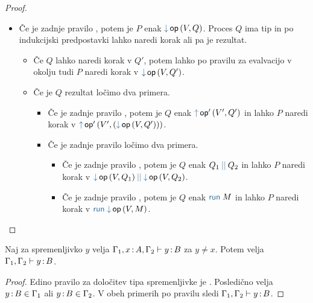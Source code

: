 \begin{proof}
\begin{itemize}
		\item Če je zadnje pravilo , potem je $P$ enak $\tmopin{op}{V}{Q}$. Proces $Q$ ima tip in po indukcijski predpostavki lahko naredi korak ali pa je rezultat.
		\begin{itemize}
			\item Če $Q$ lahko naredi korak v $Q'$, potem lahko po pravilu za evalvacijo v okolju tudi $P$ naredi korak v $\tmopin{op}{V}{Q'}$.
			\item Če je $Q$ rezultat ločimo dva primera.
			\begin{itemize}
				
				\item Če je zadnje pravilo , potem je $Q$ enak $\tmopout{op'}{V'}{Q'}$ in lahko $P$ naredi korak v $\tmopout{op'}{V'}{(\tmopin{op}{V}{Q'})}$.
				
				\item Če je zadnje pravilo  ločimo dva primera.
				\begin{itemize}
					\item Če je zadnje pravilo , potem je $Q$ enak $\tmpar{Q_1}{Q_2}$ in lahko $P$ naredi korak v $\tmpar{\tmopin{op}{V}{Q_1}}{\tmopin{op}{V}{Q_2}}$.
					\item Če je zadnje pravilo , potem je $Q$ enak $\tmrun{M}$ in lahko $P$ naredi korak v $\tmrun{\tmopin{op}{V}{M}}$.
				\end{itemize}
				
			\end{itemize}
		
		\end{itemize}
		
	\end{itemize}
		
\end{proof}


\begin{lema}\label{lem:strengthening-gamma}
	Naj za spremenljivko $y$ velja $\Gamma_1, x \mathinner{:} A, \Gamma_2 \vdash y \mathinner{:} B$ za $y \neq x$. Potem velja $\Gamma_1, \Gamma_2 \vdash y \mathinner{:} B$.
\end{lema}

\begin{proof}
	Edino pravilo za določitev tipa spremenljivke je . Posledično velja $y \mathinner{:} B \in \Gamma_1$ ali $y \mathinner{:} B \in \Gamma_2$. V obeh primerih po pravilu  sledi $\Gamma_1, \Gamma_2 \vdash y \mathinner{:} B$.
\end{proof}

